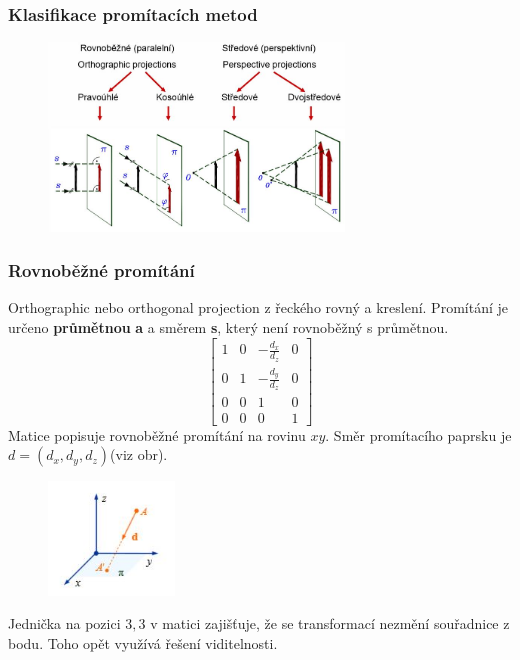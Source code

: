 \subsubsection{Klasifikace promítacích metod}
\begin{figure}[H]
\centering
\includegraphics[width=0.7\textwidth]{assets/2_klas_promitani}
\end{figure}

\subsubsection{Rovnoběžné promítání}
Orthographic nebo orthogonal projection z řeckého  rovný a  kreslení. Promítání je určeno \textbf{průmětnou} \textbf{a} a směrem \textbf{s}, který není rovnoběžný s průmětnou.
\begin{equation*}
			 \begin{bmatrix}
			     1 & 0 & -\frac{d_x}{d_z} & 0       \\[0.3em]
    			 0 & 1 & -\frac{d_y}{d_z} & 0       \\[0.3em]
     			 0 & 0 & 1 & 0 	\\[0.3em]
     			 0 & 0 & 0 & 1       
			  \end{bmatrix}
		\end{equation*}
Matice popisuje rovnoběžné promítání na rovinu $xy$. Směr promítacího paprsku je $d = (d_x, d_y, d_z)$(viz obr).
\begin{figure}[H]
\centering
\includegraphics[width=0.3\textwidth]{assets/2_overeni_rovnobezneho_promitani}
\end{figure}
Jednička na pozici $3,3$ v matici zajišťuje, že se transformací nezmění souřadnice z bodu. Toho opět využívá řešení viditelnosti.
